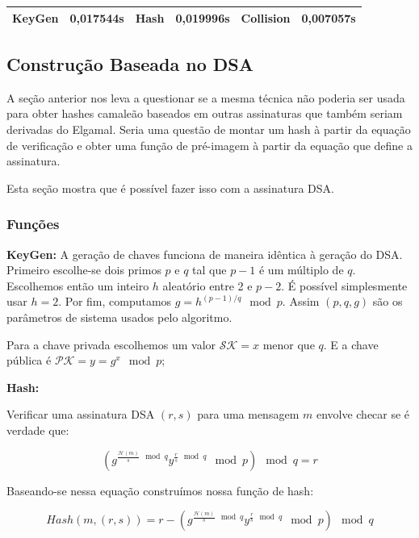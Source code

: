 \documentclass[a4paper]{article}
\begin{document}
    \begin{center}
    \begin{tabular}{|c|c|c|c|c|c|}
      \hline
      KeyGen & 0,017544s & Hash & 0,019996s & Collision & 0,007057s\\
      \hline
    \end{tabular}
    \end{center}
    
    \subsection{Construção Baseada no DSA}
    
    A seção anterior nos leva a questionar se a mesma técnica não poderia
    ser usada para obter hashes camaleão baseados em outras assinaturas
    que também seriam derivadas do Elgamal. Seria uma questão de montar um
    hash à partir da equação de verificação e obter uma função de
    pré-imagem à partir da equação que define a assinatura.
    
    Esta seção mostra que é possível fazer isso com a assinatura DSA.
    
    \subsubsection{Funções}
    
    \textbf{KeyGen: } A geração de chaves funciona de maneira idêntica à
    geração do DSA. Primeiro escolhe-se dois primos $p$ e $q$ tal que
    $p-1$ é um múltiplo de $q$. Escolhemos então um inteiro $h$ aleatório
    entre 2 e $p-2$. É possível simplesmente usar $h=2$. Por fim,
    computamos $g=h^{(p-1)/q} \mod p$. Assim $(p, q, g)$ são os parâmetros
    de sistema usados pelo algoritmo.
    
    Para a chave privada escolhemos um valor $\mathcal{SK}=x$ menor que
    $q$. E a chave pública é $\mathcal{PK}=y=g^x \mod p$;
    
    \textbf{Hash:}
    
    Verificar uma assinatura DSA $(r, s)$ para uma mensagem $m$ envolve
    checar se é verdade que:
    
    $$
    (g^{\frac{\mathcal{H}(m)}{s} \mod q}y^{\frac{r}{s} \mod q} \mod p) \mod q = r
    $$
    
    Baseando-se nessa equação construímos nossa função de hash:
    
    $$
    Hash(m, (r, s)) = r - (g^{\frac{\mathcal{H}(m)}{s} \mod q}y^{\frac{r}{s} \mod q} \mod p) \mod q
    $$
    
\end{document}
